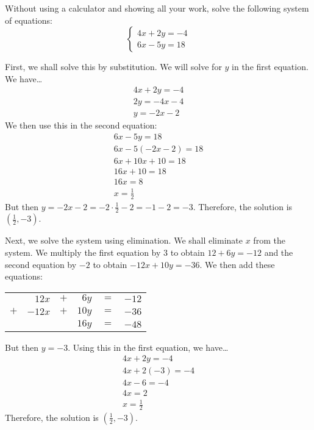 \documentclass[12pt,letterpaper]{exam}
\begin{document}
\examtitle
{} 
\scores
\bottomline
\newpage

\begin{questions}

\newpage
\question[10] Without using a calculator and showing all your work, solve the following system of equations:
	\[
	\begin{cases}
	4x + 2y= -4 \\
	6x - 5y= 18
	\end{cases}
	\] \pspace

\sol First, we shall solve this by substitution. We will solve for $y$ in the first equation. We have\dots
	\[
	\begin{gathered}
	4x + 2y = -4 \\
	2y = -4x - 4 \\
	y = -2x - 2
	\end{gathered}
	\]
We then use this in the second equation:
	\[
	\begin{gathered}
	6x - 5y = 18 \\
	6x - 5(-2x - 2) = 18 \\
	6x + 10x + 10 = 18 \\
	16x + 10 = 18 \\
	16x = 8 \\
	x = \frac{1}{2}
	\end{gathered}
	\]
But then $y = -2x - 2= -2 \cdot \frac{1}{2} - 2= -1 - 2= -3$. Therefore, the solution is $(\frac{1}{2}, -3)$. \pspace

Next, we solve the system using elimination. We shall eliminate $x$ from the system. We multiply the first equation by $3$ to obtain $12 + 6y = -12$ and the second equation by $-2$ to obtain $-12x + 10y = -36$. We then add these equations: \par
	\begin{table}[ht]
	\centering
	\begin{tabular}{rrrrrr}
		& $12x$ & $+$ & $6y$ & $=$ & $-12$ \\
	$+$  & $-12x$ & $+$ & $10y$ & $=$ & $-36$ \\ \hline
	 & & & $16y$ & $=$ & $-48$
	\end{tabular}
	\end{table} \par
But then $y= -3$. Using this in the first equation, we have\dots
	\[
	\begin{gathered}
	4x + 2y = -4 \\
	4x + 2(-3) = -4 \\
	4x - 6 = -4 \\
	4x = 2 \\
	x = \frac{1}{2}
	\end{gathered}
	\]
Therefore, the solution is $(\frac{1}{2}, -3)$. 




\end{questions}
\end{document}
